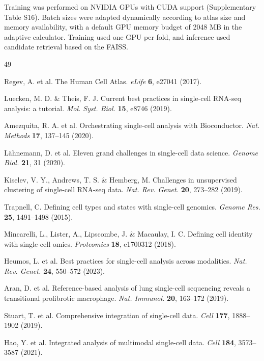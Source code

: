 \documentclass[11pt]{article}
\begin{document}
Training was performed on NVIDIA GPUs with CUDA support (Supplementary Table S16). Batch sizes were adapted dynamically according to atlas size and memory availability, with a default GPU memory budget of 2048 MB in the adaptive calculator. Training used one GPU per fold, and inference used candidate retrieval based on the FAISS.

\begin{thebibliography}{49}

Regev, A. et al. The Human Cell Atlas. \textit{eLife} \textbf{6}, e27041 (2017).

Luecken, M. D. \& Theis, F. J. Current best practices in single-cell RNA-seq analysis: a tutorial. \textit{Mol. Syst. Biol.} \textbf{15}, e8746 (2019).

Amezquita, R. A. et al. Orchestrating single-cell analysis with Bioconductor. \textit{Nat. Methods} \textbf{17}, 137--145 (2020).

L\"ahnemann, D. et al. Eleven grand challenges in single-cell data science. \textit{Genome Biol.} \textbf{21}, 31 (2020).

Kiselev, V. Y., Andrews, T. S. \& Hemberg, M. Challenges in unsupervised clustering of single-cell RNA-seq data. \textit{Nat. Rev. Genet.} \textbf{20}, 273--282 (2019).

Trapnell, C. Defining cell types and states with single-cell genomics. \textit{Genome Res.} \textbf{25}, 1491--1498 (2015).

Mincarelli, L., Lister, A., Lipscombe, J. \& Macaulay, I. C. Defining cell identity with single-cell omics. \textit{Proteomics} \textbf{18}, e1700312 (2018).

Heumos, L. et al. Best practices for single-cell analysis across modalities. \textit{Nat. Rev. Genet.} \textbf{24}, 550--572 (2023).

Aran, D. et al. Reference-based analysis of lung single-cell sequencing reveals a transitional profibrotic macrophage. \textit{Nat. Immunol.} \textbf{20}, 163--172 (2019).

Stuart, T. et al. Comprehensive integration of single-cell data. \textit{Cell} \textbf{177}, 1888--1902 (2019).

Hao, Y. et al. Integrated analysis of multimodal single-cell data. \textit{Cell} \textbf{184}, 3573--3587 (2021).


\end{thebibliography}
\end{document}
